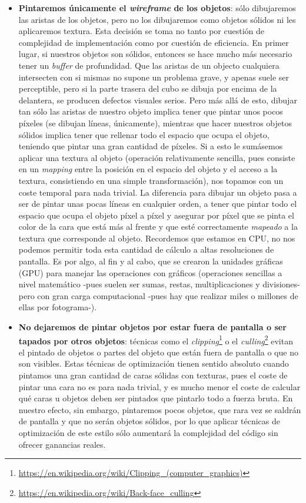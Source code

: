 \begin{itemize}
	\item \textbf{Pintaremos únicamente el \emph{wireframe} de los objetos}: sólo dibujaremos las aristas de los objetos, pero no los dibujaremos como objetos sólidos ni les aplicaremos textura. Esta decisión se toma no tanto por cuestión de complejidad de implementación como por cuestión de eficiencia. En primer lugar, si nuestros objetos son sólidos, entonces se hace mucho más necesario tener un \emph{buffer} de profundidad. Que las aristas de un objecto cualquiera intersecten con si mismas no supone un problema grave, y apenas suele ser perceptible, pero si la parte trasera del cubo se dibuja por encima de la delantera, se producen defectos visuales serios. Pero más allá de esto, dibujar tan sólo las aristas de nuestro objeto implica tener que pintar unos pocos píxeles (se dibujan líneas, únicamente), mientras que hacer nuestros objetos sólidos implica tener que rellenar todo el espacio que ocupa el objeto, teniendo que pintar una gran cantidad de píxeles. Si a esto le sumásemos aplicar una textura al objeto (operación relativamente sencilla, pues consiste en un \emph{mapping} entre la posición en el espacio del objeto y el acceso a la textura, consistiendo en una simple transformación), nos topamos con un coste temporal para nada trivial. La diferencia para dibujar un objeto pasa a ser de pintar unas pocas líneas en cualquier orden, a tener que pintar todo el espacio que ocupa el objeto píxel a píxel y asegurar por píxel que se pinta el color de la cara que está más al frente y que esté correctamente \emph{mapeado} a la textura que corresponde al objeto. Recordemos que estamos en CPU, no nos podemos permitir toda esta cantidad de cálculo a altas resoluciones de pantalla. Es por algo, al fin y al cabo, que se crearon la unidades gráficas (GPU) para manejar las operaciones con gráficos (operaciones sencillas a nivel matemático -pues suelen ser sumas, restas, multiplicaciones y divisiones- pero con gran carga computacional -pues hay que realizar miles o millones de ellas por fotograma-).
	\item \textbf{No dejaremos de pintar objetos por estar fuera de pantalla o ser tapados por otros objetos}: técnicas como el \emph{clipping}\footnote{\url{https://en.wikipedia.org/wiki/Clipping_(computer_graphics)}} o el \emph{culling}\footnote{\url{https://en.wikipedia.org/wiki/Back-face_culling}} evitan el pintado de objetos o partes del objeto que están fuera de pantalla o que no son visibles. Estas técnicas de optimización tienen sentido absoluto cuando pintamos una gran cantidad de caras sólidas con texturas, pues el coste de pintar una cara no es para nada trivial, y es mucho menor el coste de calcular qué caras u objetos deben ser pintados que pintarlo todo a fuerza bruta. En nuestro efecto, sin embargo, pintaremos pocos objetos, que rara vez se saldrán de pantalla y que no serán objetos sólidos, por lo que aplicar técnicas de optimización de este estilo sólo aumentará la complejidad del código sin ofrecer ganancias reales.
\end{itemize}

